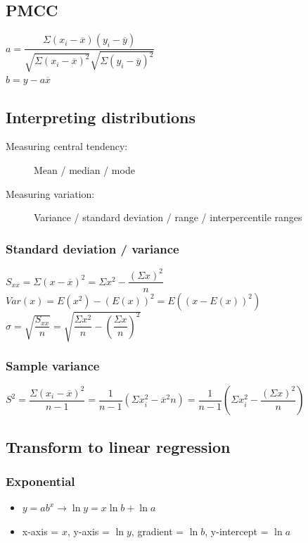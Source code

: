 \documentclass[A4paper]{article}
\begin{document}
	\subsection{PMCC}
	$a=\dfrac{\Sigma(x_i-\overline{x})(y_i-\overline{y})}{\sqrt{\Sigma(x_i-\overline{x})^2}\sqrt{\Sigma(y_i-\overline{y})^2}}$\\
	$b=y-a\overline{x}$
	
	\subsection{Interpreting distributions}
	\begin{description}
		\item[Measuring central tendency:] Mean / median / mode
		\item[Measuring variation:] Variance / standard deviation / range / interpercentile ranges
	
	\end{description}
	
	\subsubsection{Standard deviation / variance}
	$S_{xx}=\Sigma (x-\overline{x})^2=\Sigma x^2 - \dfrac{(\Sigma x)^2}{n}$\\
	$Var(x)=E(x^2)-(E(x))^2=E((x- E(x) )^2)$\\
	$\sigma=\sqrt{\dfrac{S_{xx}}{n}}=\sqrt{\dfrac{\Sigma x^2}{n} - (\dfrac{\Sigma x}{n})^2}$
	
	\subsubsection{Sample variance}
	$S^2=\dfrac{\Sigma(x_i-\overline{x})^2}{n-1}=\dfrac{1}{n-1}(\Sigma x_i^2-\overline{x}^2n)=\dfrac{1}{n-1}(\Sigma x_i^2-\dfrac{(\Sigma x)^2}{n})$
	
	\subsection{Transform to linear regression}
	\subsubsection{Exponential}
	\begin{itemize}
		\item $y=ab^x\rightarrow\ln y = x\ln b + \ln a$
		\item x-axis = $x$, y-axis = $\ln y$, gradient = $\ln b$, y-intercept = $\ln a$
	\end{itemize}
\end{document}
